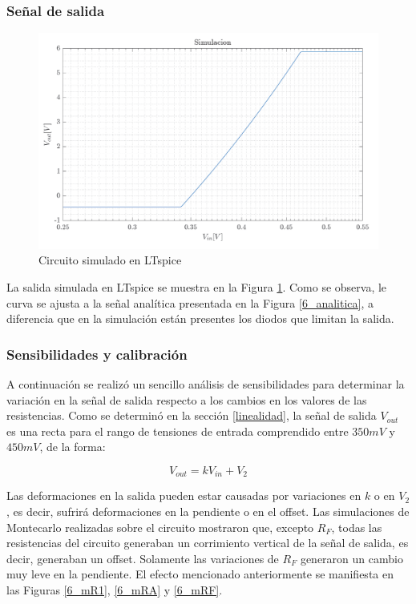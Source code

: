 \subsubsection{Señal de salida}

\begin{figure}[H]
\centering
\includegraphics[scale=0.5]{../parte6/Informe/resources/grafica_simulacion.png}
\caption{Circuito simulado en LTspice}
\label{6_simulacion}
\end{figure}

La salida simulada en LTspice se muestra en la Figura \ref{6_simulacion}. Como se observa, le curva se ajusta a la señal analítica presentada en la Figura \ref{6_analitica}, a diferencia que en la simulación están presentes los diodos que limitan la salida.

\subsubsection{Sensibilidades y calibración}

A continuación se realizó un sencillo análisis de sensibilidades para determinar la variación en la señal de salida respecto a los cambios en los valores de las resistencias. Como se determinó en la sección \ref{linealidad}, la señal de salida $V_{out}$ es una recta para el rango de tensiones de entrada comprendido entre $350mV$ y $450mV$, de la forma:

\[V_{out} = k V_{in} + V_2\]

Las deformaciones en la salida pueden estar causadas por variaciones en $k$ o en $V_2$, es decir, sufrirá deformaciones en la pendiente o en el offset.
Las simulaciones de Montecarlo realizadas sobre el circuito mostraron que, excepto $R_F$, todas las resistencias del circuito generaban un corrimiento vertical de la señal de salida, es decir, generaban un offset. Solamente las variaciones de $R_F$ generaron un cambio muy leve en la pendiente.
El efecto mencionado anteriormente se manifiesta en las Figuras \ref{6_mR1}, \ref{6_mRA} y \ref{6_mRF}.

